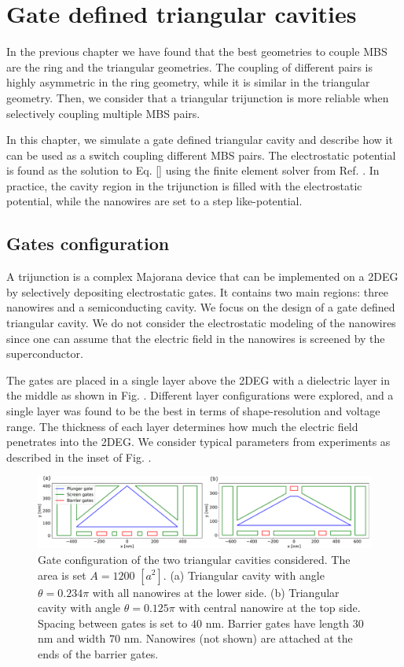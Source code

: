 \chapter{Gate defined triangular cavities}

In the previous chapter we have found that the best geometries to couple MBS are the ring and the triangular geometries.
The coupling of different pairs is highly asymmetric in the ring geometry, while it is similar in the triangular geometry.
Then, we consider that a triangular trijunction is more reliable when selectively coupling multiple MBS pairs.

In this chapter, we simulate a gate defined triangular cavity and describe how it can be used as a switch coupling different MBS pairs.
The electrostatic potential is found as the solution to Eq. \eqref{} using the finite element solver from Ref. .
In practice, the cavity region in the trijunction is filled with the electrostatic potential, while the nanowires are set to a step like-potential.

\section{Gates configuration}

A trijunction is a complex Majorana device that can be implemented on a 2DEG by selectively depositing electrostatic gates.
It contains two main regions: three nanowires and a semiconducting cavity.
We focus on the design of a gate defined triangular cavity.
We do not consider the electrostatic modeling of the nanowires since one can assume that the electric field in the nanowires is screened by the superconductor.

The gates are placed in a single layer above the 2DEG with a dielectric layer in the middle as shown in Fig. .
Different layer configurations were explored, and a single layer was found to be the best in terms of shape-resolution and voltage range.
The thickness of each layer determines how much the electric field penetrates into the 2DEG.
We consider typical parameters from experiments as described in the inset of Fig. .

\begin{figure}[h!]
\centering
  \includegraphics[width=\linewidth]{figures/gate_configurations.pdf}
  \caption{Gate configuration of the two triangular cavities considered. The area is set $A=1200$ $[a^2]$. (a) Triangular cavity with angle $\theta = 0.234 \pi$ with all nanowires at the lower side. (b) Triangular cavity with angle $\theta = 0.125\pi$ with central nanowire at the top side. Spacing between gates is set to $40$ nm. Barrier gates have length $30$ nm and width $70$ nm. Nanowires (not shown) are attached at the ends of the barrier gates.}
  \label{fig:gates}
\end{figure}

